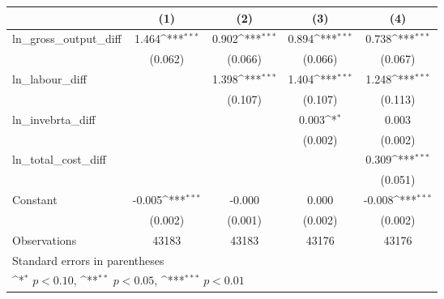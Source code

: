 {
\def\sym#1{\ifmmode^{#1}\else\(^{#1}\)\fi}
\begin{tabular}{l*{4}{c}}
\hline\hline
                &\multicolumn{1}{c}{(1)}         &\multicolumn{1}{c}{(2)}         &\multicolumn{1}{c}{(3)}         &\multicolumn{1}{c}{(4)}         \\
\hline
ln\_gross\_output\_diff&    1.464\sym{***}&    0.902\sym{***}&    0.894\sym{***}&    0.738\sym{***}\\
                &  (0.062)         &  (0.066)         &  (0.066)         &  (0.067)         \\
[1em]
ln\_labour\_diff  &                  &    1.398\sym{***}&    1.404\sym{***}&    1.248\sym{***}\\
                &                  &  (0.107)         &  (0.107)         &  (0.113)         \\
[1em]
ln\_invebrta\_diff&                  &                  &    0.003\sym{*}  &    0.003         \\
                &                  &                  &  (0.002)         &  (0.002)         \\
[1em]
ln\_total\_cost\_diff&                  &                  &                  &    0.309\sym{***}\\
                &                  &                  &                  &  (0.051)         \\
[1em]
Constant        &   -0.005\sym{***}&   -0.000         &    0.000         &   -0.008\sym{***}\\
                &  (0.002)         &  (0.001)         &  (0.002)         &  (0.002)         \\
\hline
Observations    &    43183         &    43183         &    43176         &    43176         \\
\hline\hline
\multicolumn{5}{l}{\footnotesize Standard errors in parentheses}\\
\multicolumn{5}{l}{\footnotesize \sym{*} \(p<0.10\), \sym{**} \(p<0.05\), \sym{***} \(p<0.01\)}\\
\end{tabular}
}
